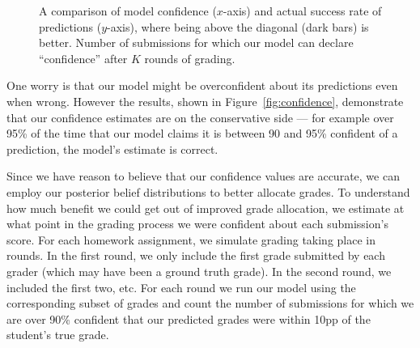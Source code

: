 \begin{figure}
\begin{center}
\end{center}
\caption[Model confidence vs accuracy]{
   A comparison of model confidence ($x$-axis) and actual success rate of predictions ($y$-axis), where
 being above the diagonal (dark bars) is better.
  Number of submissions for which our model can declare ``confidence''
 after $K$ rounds of grading.
 }
\label{tab:predacc}

\end{figure}

One worry is that our model might be overconfident about
its predictions even when wrong. However the results, shown in Figure~\ref{fig:confidence}, demonstrate
that our confidence estimates are on the conservative side ---
for example over 95\% of the time that our model claims it is between 90 and 95\% confident of a prediction, the model's estimate is correct. 

Since we have reason to believe that our confidence values are accurate, we can employ our posterior belief distributions to better allocate grades.  To understand how much benefit we could get out of improved grade allocation, we estimate at what point in the grading process we were confident about each submission's score. For each homework assignment, we simulate grading taking place in rounds. In the first round, we only include the first grade submitted by each grader (which may have been a ground truth grade). In the second round, we included the first two, etc. For each round we run our model using the corresponding subset of grades and count the number of submissions  for which we are over 90\% confident that our predicted grades were within 10pp of the student's true grade. 

